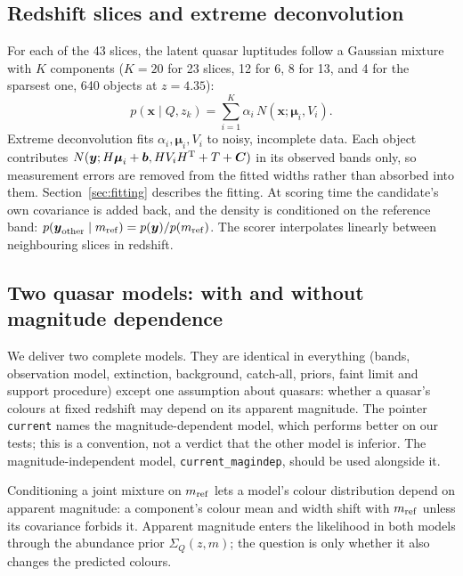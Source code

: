 \documentclass[11pt,a4paper]{article}
\newcommand{\vect}[1]{\boldsymbol{#1}}
\newcommand{\code}[1]{\texttt{#1}}
\begin{document}
\subsection{Redshift slices and extreme deconvolution}
For each of the 43 slices, the latent quasar luptitudes follow a Gaussian mixture with $K$
components ($K=20$ for 23 slices, 12 for 6, 8 for 13, and 4 for the sparsest one, 640 objects at
$z=4.35$):
\begin{equation}
p(\vect{x}\mid Q,z_k)=\sum_{i=1}^{K}\alpha_i\,N(\vect{x};\vect{\mu}_i,V_i).
\end{equation}
Extreme deconvolution \citep{Bovy2011XD} fits $\alpha_i,\vect{\mu}_i,V_i$ to noisy, incomplete data.
Each object contributes $N(\vect{y};H\vect{\mu}_i+\vect{b},HV_iH^{\rm T}+T+\vect{C})$ in its observed
bands only, so measurement errors are removed from the fitted widths rather than absorbed into them.
Section~\ref{sec:fitting} describes the fitting. At scoring time the candidate's own covariance is
added back, and the density is conditioned on the reference band:
$p(\vect{y}_{\rm other}\mid m_{\rm ref})=p(\vect{y})/p(m_{\rm ref})$. The scorer interpolates linearly
between neighbouring slices in redshift.

\subsection{Two quasar models: with and without magnitude dependence}\label{sec:variants}
We deliver two complete models. They are identical in everything (bands, observation model, extinction,
background, catch-all, priors, faint limit and support procedure) except one assumption about quasars:
whether a quasar's colours at fixed redshift may depend on its apparent magnitude. The pointer
\code{current} names the magnitude-dependent model, which performs better on our tests; this is a
convention, not a verdict that the other model is inferior. The magnitude-independent model,
\code{current\_magindep}, should be used alongside it.

Conditioning a joint mixture on $m_{\rm ref}$ lets a model's colour distribution depend on apparent
magnitude: a component's colour mean and width shift with $m_{\rm ref}$ unless its covariance forbids it.
Apparent magnitude enters the likelihood in both models through the abundance prior $\Sigma_Q(z,m)$; the
question is only whether it also changes the predicted colours.
\end{document}

